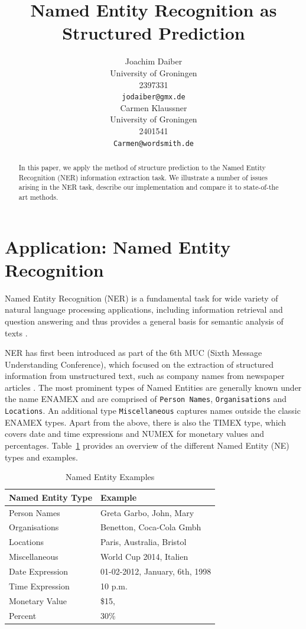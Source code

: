 \documentclass[11pt]{article}
\title{Named Entity Recognition as Structured Prediction}
\author{Joachim Daiber \\
  University of Groningen \\
  2397331\\
  {\tt jodaiber@gmx.de} \\\And
  Carmen Klaussner \\
  University of Groningen \\
  2401541\\
  {\tt Carmen@wordsmith.de} \\}
\date{}
\begin{document}
\maketitle

\begin{abstract}
In this paper, we apply the method of structure prediction to the Named Entity Recognition (NER) information extraction task.
We illustrate a number of issues arising in the NER task, describe our implementation and compare it to state-of-the art methods.
\end{abstract}


\section{Application: Named Entity Recognition}

Named Entity Recognition (NER) is a fundamental task for wide variety of natural language processing applications, including information retrieval and question answering
and thus provides a general basis for semantic analysis of texts \cite{Chen:2010:UDB:1870457.1870473}.

NER has first been introduced as part of the 6th MUC (Sixth Message Understanding Conference),
which focused on the extraction of structured information from unstructured text, such as company names from newspaper articles \cite{nadeau2007survey}.
The most prominent types of Named Entities are generally known under the name ENAMEX and are comprised of \texttt{Person Names}, \texttt{Organisations} and \texttt{Locations}.
An additional type \texttt{Miscellaneous} captures names outside the classic ENAMEX types.
Apart from the above, there is also the TIMEX type, which covers date and time expressions and NUMEX for monetary values and percentages.
Table~\ref{table:NETypes} provides an overview of the different Named Entity (NE) types and examples.

\begin{table}[h!]
\scriptsize
\begin{tabular}{ l l }

\bf Named Entity Type & \bf Example \\
\hline 
Person Names & Greta Garbo, John, Mary \\
Organisations& Benetton, Coca-Cola Gmbh\\
Locations&  Paris, Australia, Bristol\\
Miscellaneous& World Cup 2014, Italien\\
 Date Expression& 01-02-2012, January, 6th, 1998 \\
Time Expression & 10 p.m.\\
Monetary Value &  \$15, \textsterling 100    \\
Percent &   30\% \\
\end{tabular}
\caption{Named Entity Examples}
\label{table:NETypes}
\end{table}
\end{document}
